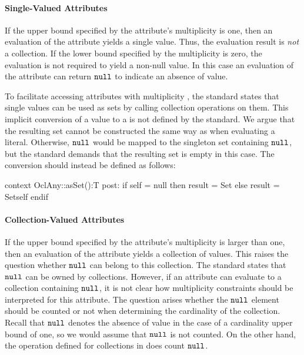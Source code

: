 \paragraph{Single-Valued Attributes}\label{sec:single-valued-properties}
If the upper bound specified by the attribute's multiplicity is one,
then an evaluation of the attribute yields a single value.
Thus, the evaluation result is \emph{not} a collection. If the lower bound specified by the
multiplicity is zero, the evaluation is not required to yield a non-null value. In this case an
evaluation of the attribute can return $\mathtt{null}$ to indicate an
absence of value.

To facilitate accessing attributes with multiplicity , the \OCL
standard states that single values can be used as sets by calling collection
operations on them. This implicit conversion of a value to a
 is not defined by the standard. We argue that the resulting set
cannot be constructed the same way as when evaluating a 
literal. Otherwise, $\mathtt{null}$ would be mapped to the singleton set
containing $\mathtt{null}$, but the standard demands that
the resulting set is empty in this case. The conversion should instead
be defined as follows:
\begin{ocl}
context OclAny::asSet():T
  post: if self = null then result = Set{}
        else result = Set{self} endif
\end{ocl}

\paragraph{Collection-Valued Attributes}\label{sec:collection-valued-properties}
If the upper bound specified by the attribute's multiplicity is larger than one,
then an evaluation of the attribute yields a collection of values.  This raises
the question whether $\mathtt{null}$ can belong to this collection. The \OCL
standard states that $\mathtt{null}$ can be owned by collections. However, if
an attribute can evaluate to a collection containing $\mathtt{null}$, it is not
clear how multiplicity constraints should be interpreted for this attribute. The
question arises whether the $\mathtt{null}$ element should be counted or not
when determining the cardinality of the collection. Recall that $\mathtt{null}$
denotes the absence of value in the case of a cardinality upper bound of one, so
we would assume that $\mathtt{null}$ is not counted. On the other hand, the
operation  defined for collections in \OCL does count
$\mathtt{null}$.

